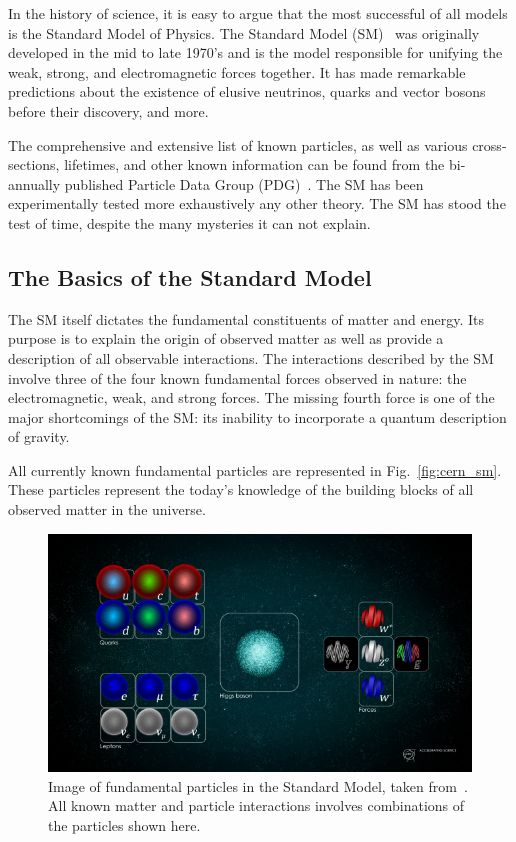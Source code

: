 In the history of science, it is easy to argue that the most successful of all models is the Standard Model of Physics.
The Standard Model (SM)~\citep{GLASHOW1961579, salam1964electromagnetic, weinberg1967model} was originally developed in the mid to late 1970's and is the model responsible for unifying the weak, strong, and electromagnetic forces together.
It has made remarkable predictions about the existence of elusive neutrinos, quarks and vector bosons before their discovery, and more.

The comprehensive and extensive list of known particles, as well as various cross-sections, lifetimes, and other known information can be found from the bi-annually published Particle Data Group (PDG)~\citep{Workman:2022ynf}.
The SM has been experimentally tested more exhaustively any other theory.
The SM has stood the test of time, despite the many mysteries it can not explain.

\subsection{The Basics of the Standard Model}

The SM itself dictates the fundamental constituents of matter and energy.
Its purpose is to explain the origin of observed matter as well as provide a description of all observable interactions.
The interactions described by the SM involve three of the four known fundamental forces observed in nature: the electromagnetic, weak, and strong forces.
The missing fourth force is one of the major shortcomings of the SM: its inability to incorporate a quantum description of gravity.

All currently known fundamental particles are represented in Fig.~\ref{fig:cern_sm}.
These particles represent the today's knowledge of the building blocks of all observed matter in the universe.

\begin{figure}[]
\centering
\includegraphics[width=\textwidth]{images/STDM_higgs_and_field_D.png}
\caption{Image of fundamental particles in the Standard Model, taken from~\citep{dominguez_2015}.
  All known matter and particle interactions involves combinations of the particles shown here.}
\end{figure}
~\label{fig:cern_sm}

